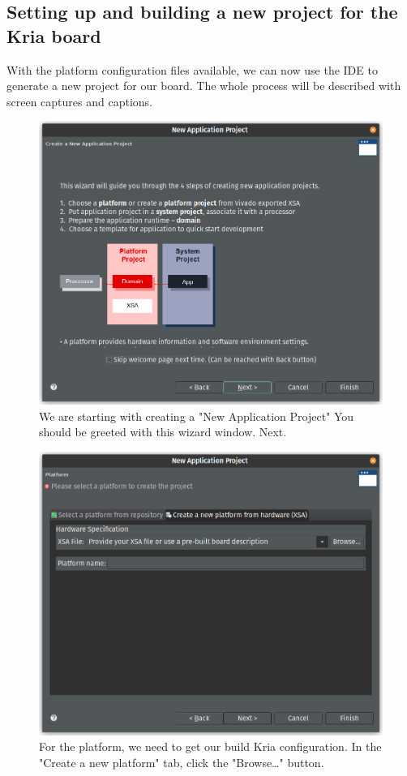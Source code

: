 \documentclass[10pt]{article}
\begin{document}
\subsection{Setting up and building a new project for the Kria board}
\label{sec:org1582d2f}
With the platform configuration files available, we can now use the IDE to generate a
new project for our board. The whole process will be described with screen captures and
captions.

\begin{figure}[htbp]
\centering
\includegraphics[width=.6\textwidth]{./img/vitis_new/project1.png}
\caption{\label{fig:org6a2f5af}We are starting with creating a "New Application Project" You should be greeted with this wizard window. Next.}
\end{figure}

\begin{figure}[htbp]
\centering
\includegraphics[width=.6\textwidth]{./img/vitis_new/project2.png}
\caption{\label{fig:org4d00243}For the platform, we need to get our build Kria configuration. In the "Create a new platform" tab, click the "Browse\ldots{}" button.}
\end{figure}
\end{document}
